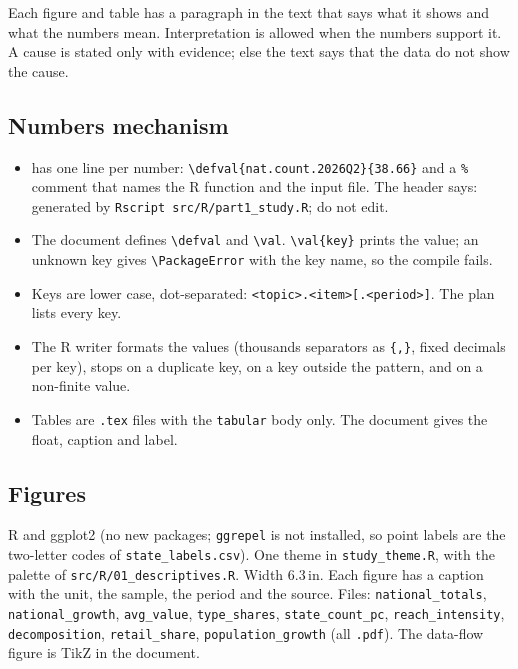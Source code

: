 \documentclass[11pt,a4paper]{article}
\newcommand{\f}[1]{\texttt{#1}}
\begin{document}
Each figure and table has a paragraph in the text that says what it shows and what the numbers mean.
Interpretation is allowed when the numbers support it. A cause is stated only with evidence; else the
text says that the data do not show the cause.

\subsection{Numbers mechanism}
\begin{itemize}
  \item {} has one line per number:
        \verb|\defval{nat.count.2026Q2}{38.66}| and a \verb|%| comment that names the R function and
        the input file. The header says: generated by \f{Rscript src/R/part1\_study.R}; do not edit.
  \item The document defines \verb|\defval| and \verb|\val|. \verb|\val{key}| prints the value;
        an unknown key gives \verb|\PackageError| with the key name, so the compile fails.
  \item Keys are lower case, dot-separated: \f{<topic>.<item>[.<period>]}. The plan lists every key.
  \item The R writer formats the values (thousands separators as \verb|{,}|, fixed decimals per key),
        stops on a duplicate key, on a key outside the pattern, and on a non-finite value.
  \item Tables are \f{.tex} files with the \f{tabular} body only. The document gives the float,
        caption and label.
\end{itemize}

\subsection{Figures}
R and ggplot2 (no new packages; \f{ggrepel} is not installed, so point labels are the two-letter
codes of \f{state\_labels.csv}). One theme in \f{study\_theme.R}, with the palette of
\f{src/R/01\_descriptives.R}. Width 6.3\,in. Each figure has a caption with the unit, the sample, the
period and the source. Files: \f{national\_totals}, \f{national\_growth}, \f{avg\_value},
\f{type\_shares}, \f{state\_count\_pc}, \f{reach\_intensity}, \f{decomposition}, \f{retail\_share},
\f{population\_growth} (all \f{.pdf}). The data-flow figure is TikZ in the document.
\end{document}
